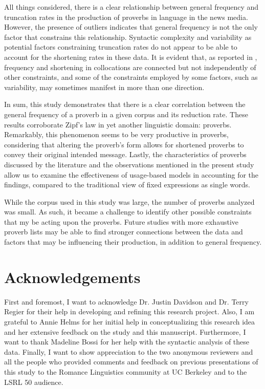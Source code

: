 \documentclass[output=paper,colorlinks,citecolor=brown,draftmode]{langscibook}
\begin{document}
All things considered, there is a clear relationship between general frequency and truncation rates in the production of proverbs in language in the news media. However, the presence of outliers indicates that general frequency is not the only factor that constrains this relationship. Syntactic complexity and variability as potential factors constraining truncation rates do not appear to be able to account for the shortening rates in these data. It is evident that, as reported in \citet{erker2012role}, frequency and shortening in collocations are connected but not independently of other constraints, and some of the constraints employed by some factors, such as variability, may sometimes manifest in more than one direction.

In sum, this study demonstrates that there is a clear correlation between the general frequency of a proverb in a given corpus and its reduction rate. These results corroborate Zipf's law in yet another linguistic domain: proverbs. Remarkably, this phenomenon seems to be very productive in proverbs, considering that altering the proverb’s form allows for shortened proverbs to convey their original intended message. Lastly, the characteristics of proverbs discussed by the literature and the observations mentioned in the present study allow us to examine the effectiveness of usage-based models in accounting for the findings, compared to the traditional view of fixed expressions as single words.

While the corpus used in this study was large, the number of proverbs analyzed was small. As such, it became a challenge to identify other possible constraints that my be acting upon the proverbs. Future studies with more exhaustive proverb lists may be able to find stronger connections between the data and factors that may be influencing their production, in addition to general frequency.


\section*{Acknowledgements}

First and foremost, I want to acknowledge Dr. Justin Davidson and Dr. Terry Regier for their help in developing and refining this research project. Also, I am grateful to Annie Helms for her initial help in conceptualizing this research idea and her extensive feedback on the study and this manuscript. Furthermore, I want to thank Madeline Bossi for her help with the syntactic analysis of these data. Finally, I want to show appreciation to the two anonymous reviewers and all the people who provided comments and feedback on previous presentations of this study to the Romance Linguistics community at UC Berkeley and to the LSRL 50 audience.
\end{document}
